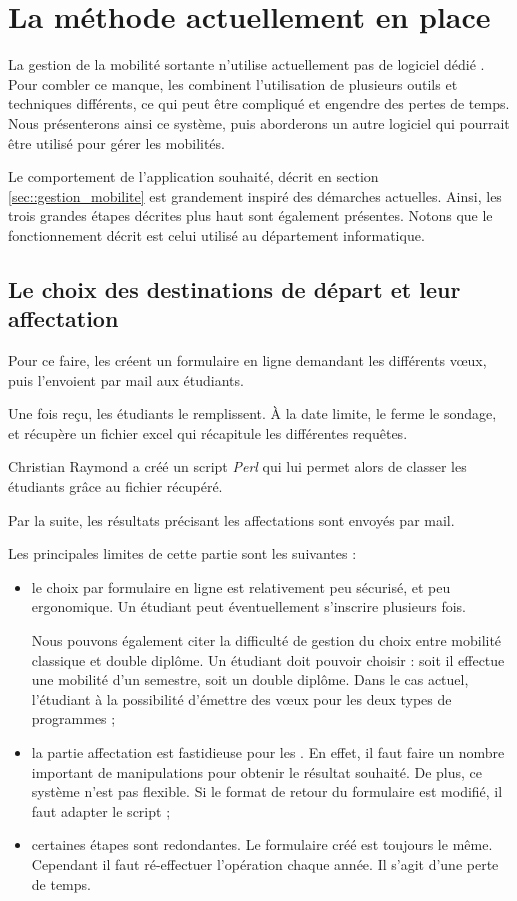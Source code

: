 
		\section{La méthode actuellement en place}
	

La gestion de la mobilité sortante n'utilise actuellement pas de logiciel dédié . 
Pour combler ce manque, les \ris combinent l'utilisation de plusieurs outils et techniques différents, ce qui peut être compliqué et engendre des pertes de temps. 
Nous présenterons ainsi ce système, puis aborderons un autre logiciel qui pourrait être utilisé pour gérer les mobilités.

\medbreak

Le comportement de l'application souhaité, décrit en section \ref{sec::gestion_mobilite} est grandement inspiré des démarches actuelles. 
Ainsi, les trois grandes étapes décrites plus haut sont également présentes. 
Notons que le fonctionnement  décrit est celui utilisé au département informatique.  
 \subsection{Le choix des destinations de départ et leur affectation}
		 
		Pour ce faire, les \ris créent un formulaire en ligne demandant les différents vœux, puis l'envoient par mail aux étudiants. 
		
		Une fois reçu, les étudiants le remplissent. À la date limite, le \ri ferme le sondage, et récupère un fichier excel qui récapitule les différentes requêtes. 
		
		Christian Raymond a créé un script \textit{Perl} qui lui permet alors de classer les étudiants grâce au fichier récupéré.
		
		Par la suite, les résultats  précisant les affectations sont envoyés par mail. 
		
		\medbreak
		
		Les principales limites de cette partie sont les suivantes : 
		\begin{itemize}
		\item le choix par formulaire en ligne est relativement peu sécurisé, et peu ergonomique. Un étudiant peut  éventuellement s'inscrire plusieurs fois.
		
		Nous pouvons également citer la difficulté de gestion du choix entre mobilité classique et double diplôme. Un étudiant doit pouvoir choisir : soit il effectue une mobilité d'un semestre, soit un double diplôme. Dans le cas actuel, l'étudiant à la possibilité d'émettre des vœux pour les deux types de programmes ;
		
		\item la partie affectation est fastidieuse  pour les \ris. En effet, il faut faire un nombre important de manipulations pour obtenir le résultat  souhaité. De plus, ce système n'est pas flexible. Si le format de retour du formulaire est modifié, il faut adapter le script ;

		\item certaines étapes sont redondantes. Le formulaire créé est toujours le même. Cependant il faut ré-effectuer l'opération chaque année. Il s'agit d'une perte de temps.
			\end{itemize}

